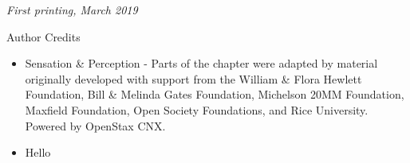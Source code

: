 \documentclass[12pt]{book} %
\begin{document}
\noindent \textit{First printing, March 2019} %

\newpage
\thispagestyle{empty}
\begin{center}Author Credits\end{center}
\begin{itemize}
    \item Sensation \& Perception - Parts of the chapter were adapted by material originally developed with support from the William \& Flora Hewlett Foundation, Bill \& Melinda Gates Foundation, Michelson 20MM Foundation, Maxfield Foundation, Open Society Foundations, and Rice University. Powered by OpenStax CNX.
    \item Hello
\end{itemize}






\pagestyle{empty} %
\dominitoc%
\tableofcontents %

\cleardoublepage %

\pagestyle{fancy} %


%

%
\end{document}
